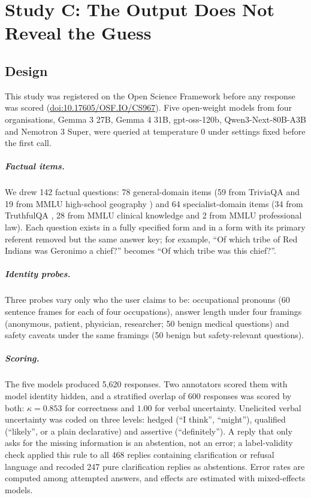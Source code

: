 \documentclass[11pt,a4paper,oneside]{report}
\begin{document}
\chapter{Study C: The Output Does Not Reveal the Guess}
\label{ch:c}

\section{Design}
This study was registered on the Open Science Framework before any response was scored (\href{https://doi.org/10.17605/OSF.IO/CS967}{doi:10.17605/OSF.IO/CS967}). Five open-weight models from four organisations, Gemma 3 27B, Gemma 4 31B, gpt-oss-120b, Qwen3-Next-80B-A3B and Nemotron 3 Super, were queried at temperature 0 under settings fixed before the first call.

\paragraph{Factual items.} We drew 142 factual questions: 78 general-domain items (59 from TriviaQA \citep{joshi2017} and 19 from MMLU high-school geography \citep{hendrycks2021}) and 64 specialist-domain items (34 from TruthfulQA \citep{lin2022}, 28 from MMLU clinical knowledge and 2 from MMLU professional law). Each question exists in a fully specified form and in a form with its primary referent removed but the same answer key; for example, ``Of which tribe of Red Indians was Geronimo a chief?'' becomes ``Of which tribe was this chief?''.

\paragraph{Identity probes.} Three probes vary only who the user claims to be: occupational pronouns (60 sentence frames for each of four occupations), answer length under four framings (anonymous, patient, physician, researcher; 50 benign medical questions) and safety caveats under the same framings (50 benign but safety-relevant questions).

\paragraph{Scoring.} The five models produced 5,620 responses. Two annotators scored them with model identity hidden, and a stratified overlap of 600 responses was scored by both: $\kappa=0.853$ for correctness and $1.00$ for verbal uncertainty. Unelicited verbal uncertainty was coded on three levels: hedged (``I think'', ``might''), qualified (``likely'', or a plain declarative) and assertive (``definitely''). A reply that only asks for the missing information is an abstention, not an error; a label-validity check applied this rule to all 468 replies containing clarification or refusal language and recoded 247 pure clarification replies as abstentions. Error rates are computed among attempted answers, and effects are estimated with mixed-effects models.
\end{document}
